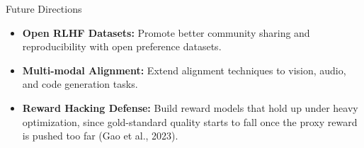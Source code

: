 \begin{frame}{Future Directions}
  \begin{itemize}
    \item[\textcolor{red}{$\blacktriangleright$}] \textbf{Open RLHF Datasets:} Promote better community sharing and reproducibility with open preference datasets.
    \item[\textcolor{red}{$\blacktriangleright$}] \textbf{Multi-modal Alignment:} Extend alignment techniques to vision, audio, and code generation tasks.
    \item[\textcolor{red}{$\blacktriangleright$}] \textbf{Reward Hacking Defense:} Build reward models that hold up under heavy optimization, since gold-standard quality starts to fall once the proxy reward is pushed too far (Gao et al., 2023).
  \end{itemize}
\end{frame}
